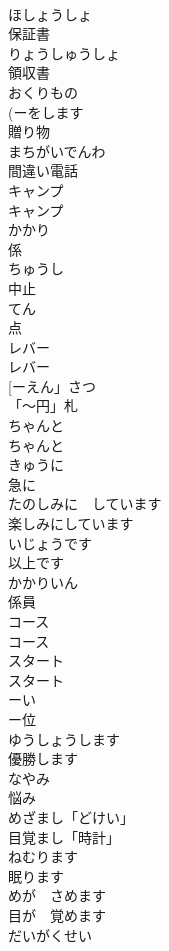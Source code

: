 \documentclass[8pt]{extreport}
\begin{document}
\begin{CJK}{UTF8}{min}
\\	ほしょうしょ	
\\	保証書	
\\	りょうしゅうしょ	
\\	領収書	
\\	おくりもの	
\\	(ーをします 
\\	贈り物		
\\	まちがいでんわ	
\\	間違い電話		
\\	キャンプ	
\\	キャンプ		
\\	かかり	
\\	係	
\\	ちゅうし	
\\	中止	
\\	てん	
\\	点	
\\	レバー	
\\	レバー		
\\	[ーえん」さつ	
\\	「〜円」札		
\\	ちゃんと	
\\	ちゃんと		
\\	きゅうに	
\\	急に	
\\	たのしみに　しています	
\\	楽しみにしています		
\\	いじょうです	
\\	以上です	
\\	かかりいん	
\\	係員		
\\	コース	
\\	コース		
\\	スタート	
\\	スタート		
\\	ーい	
\\	ー位		
\\	ゆうしょうします	
\\	優勝します		
\\	なやみ	
\\	悩み		
\\	めざまし「どけい」	
\\	目覚まし「時計」		
\\	ねむります	
\\	眠ります		
\\	めが　さめます	
\\	目が　覚めます		
\\	だいがくせい	

\end{CJK}
\end{document}
